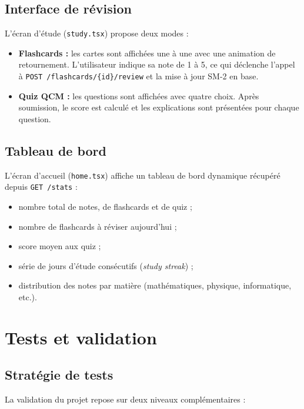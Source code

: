 \documentclass[12pt,a4paper]{report}
\begin{document}
\subsection{Interface de révision}

L'écran d'étude (\texttt{study.tsx}) propose deux modes :

\begin{itemize}[label=--]
    \item \textbf{Flashcards :} les cartes sont affichées une à une avec une animation de retournement. L'utilisateur indique sa note de 1 à 5, ce qui déclenche l'appel à \texttt{POST /flashcards/\{id\}/review} et la mise à jour SM-2 en base.
    \item \textbf{Quiz QCM :} les questions sont affichées avec quatre choix. Après soumission, le score est calculé et les explications sont présentées pour chaque question.
\end{itemize}

\subsection{Tableau de bord}

L'écran d'accueil (\texttt{home.tsx}) affiche un tableau de bord dynamique récupéré depuis \texttt{GET /stats} :

\begin{itemize}[label=--]
    \item nombre total de notes, de flashcards et de quiz ;
    \item nombre de flashcards à réviser aujourd'hui ;
    \item score moyen aux quiz ;
    \item série de jours d'étude consécutifs (\textit{study streak}) ;
    \item distribution des notes par matière (mathématiques, physique, informatique, etc.).
\end{itemize}

\section{Tests et validation}

\subsection{Stratégie de tests}

La validation du projet repose sur deux niveaux complémentaires :
\end{document}
